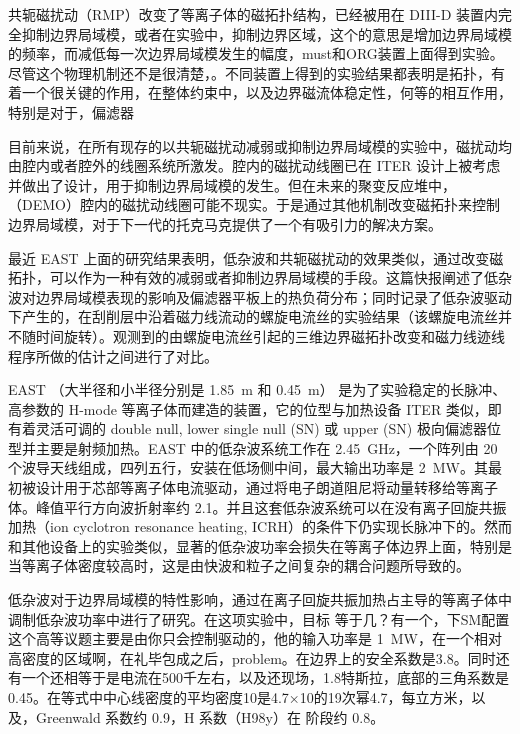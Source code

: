 共轭磁扰动（RMP）改变了等离子体的磁拓扑结构，已经被用在 DIII-D 装置内完全抑制边界局域模，或者在实验中，抑制边界区域，这个的意思是增加边界局域模的频率，而减低每一次边界局域模发生的幅度，must和ORG装置上面得到实验。尽管这个物理机制还不是很清楚，。不同装置上得到的实验结果都表明是拓扑，有着一个很关键的作用，在整体约束中，以及边界磁流体稳定性，何等的相互作用，特别是对于，偏滤器


目前来说，在所有现存的以共轭磁扰动减弱或抑制边界局域模的实验中，磁扰动均由腔内或者腔外的线圈系统所激发。腔内的磁扰动线圈已在 ITER 设计上被考虑并做出了设计，用于抑制边界局域模的发生。但在未来的聚变反应堆中，（DEMO）腔内的磁扰动线圈可能不现实。于是通过其他机制改变磁拓扑来控制边界局域模，对于下一代的托克马克提供了一个有吸引力的解决方案。

最近 EAST 上面的研究结果表明，低杂波和共轭磁扰动的效果类似，通过改变磁拓扑，可以作为一种有效的减弱或者抑制边界局域模的手段。这篇快报阐述了低杂波对边界局域模表现的影响及偏滤器平板上的热负荷分布；同时记录了低杂波驱动下产生的，在刮削层中沿着磁力线流动的螺旋电流丝的实验结果（该螺旋电流丝并不随时间旋转）。观测到的由螺旋电流丝引起的三维边界磁拓扑改变和磁力线迹线程序所做的估计之间进行了对比。

EAST （大半径和小半径分别是 \SI{1.85}{\metre} 和 \SI{0.45}{\metre}） 是为了实验稳定的长脉冲、高参数的 H-mode 等离子体而建造的装置，它的位型与加热设备 ITER 类似，即有着灵活可调的 double null, lower single null (SN) 或 upper (SN) 极向偏滤器位型并主要是射频加热。EAST 中的低杂波系统工作在 \SI{2.45}{\giga\hertz}，一个阵列由 20 个波导天线组成，四列五行，安装在低场侧中间，最大输出功率是 \SI{2}{\mega\watt}。其最初被设计用于芯部等离子体电流驱动，通过将电子朗道阻尼将动量转移给等离子体。峰值平行方向波折射率约 2.1。并且这套低杂波系统可以在没有离子回旋共振加热（ion cyclotron resonance heating, ICRH）的条件下仍实现长脉冲下的\Hmode 。然而和其他设备上的实验类似，显著的低杂波功率会损失在等离子体边界上面，特别是当等离子体密度较高时，这是由快波和粒子之间复杂的耦合问题所导致的。

低杂波对于边界局域模的特性影响，通过在离子回旋共振加热占主导的\Hmode 等离子体中调制低杂波功率中进行了研究。在这项实验中，目标 \Hmode 等于几？有一个，下SM配置这个高\Hmode 等议题主要是由你只会控制驱动的，他的输入功率是 \SI{1}{\mega\watt}，在一个相对高密度的区域啊，在礼毕包成之后，problem。在边界上的安全系数是3.8。同时还有一个还相等于是电流在500千左右，以及还现场，1.8特斯拉，底部的三角系数是0.45。在等式中中心线密度的平均密度10是4.7×10的19次幂\SI{4.7}{}，每立方米，以及，Greenwald 系数约 0.9，H 系数（H98y）在 \Hmode 阶段约 0.8。

